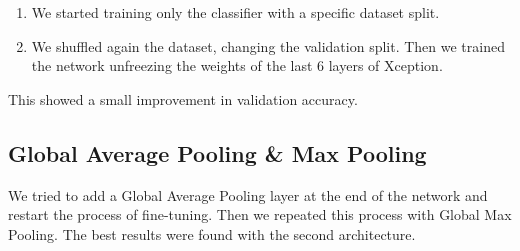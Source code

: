 \documentclass{article}
\begin{document}
			\begin{enumerate}
				\item We started training only the classifier with a specific dataset split.
				\item We shuffled again the dataset, changing the validation split. Then we trained the network unfreezing the weights of the last 6 layers of Xception.
			\end{enumerate}
			
			\noindent
			
			This showed a small improvement in validation accuracy.		
			
		\subsection{Global Average Pooling \& Max Pooling} 
			
			We tried to add a Global Average Pooling layer at the end of the network and restart the process of fine-tuning. Then we repeated this process with Global Max Pooling. The best results were found with the second architecture. 
		
\end{document}
